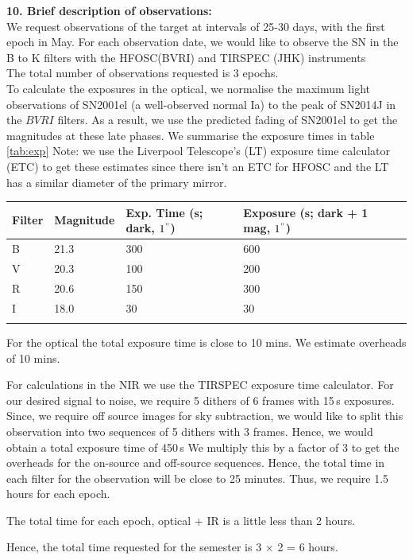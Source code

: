 \documentclass[11pt]{article}
\begin{document}
{\bf 10. Brief description of observations: } \\
We request observations of the target at intervals of 25-30 days, with the first epoch in May. For each observation date, we would like to observe the SN in the  B to K filters with the HFOSC(BVRI) and TIRSPEC (JHK) instruments  \\

The total number of observations requested is 3 epochs.\\

To calculate the exposures in the optical, we normalise the maximum light observations of SN2001el (a well-observed normal Ia) to the peak of SN2014J in the $BVRI$ filters. As a result, we use the predicted fading of SN2001el to get the magnitudes at these late phases. 
We summarise the exposure times in  table \ref{tab:exp}
Note: we use the Liverpool Telescope's (LT) exposure time calculator (ETC) to get these estimates since there isn't an ETC for HFOSC and the LT has a similar diameter of the primary mirror. 

\begin{tabular}{lllll|}
Filter & Magnitude & Exp. Time (s; dark, $1^{"}$)  & Exposure (s; dark + 1 mag, $1^{"}$) \\
\hline
B	& 21.3  & 300 & 600 \\
V	& 20.3 & 100 & 200 \\
R	&  20.6 & 150	&  300   \\
I	&   18.0  & 30 & 30 \\
\hline
\label{tab:exp}
\end{tabular}
\newpage
For the optical the total exposure time is close to 10 mins. We estimate overheads of 10 mins. 

For  calculations in the NIR we use the TIRSPEC exposure time calculator. For our desired signal to noise, we require 5 dithers of 6 frames with 15\,s exposures. Since, we require off source images for sky subtraction, we would like to split this observation into two sequences of 5 dithers with 3 frames. 
Hence, we would obtain a total exposure time of 450\,s 
We multiply this by a factor of 3 to get the overheads for the on-source and off-source sequences. Hence, the total time in each filter for the observation will be close to 25 minutes. Thus, we require 1.5 hours for each epoch.

The total time for each epoch, optical + IR is  a little less than 2 hours.

 Hence, the total time requested for the semester is 3 $\times$ 2 = 6 hours. 
\end{document}
